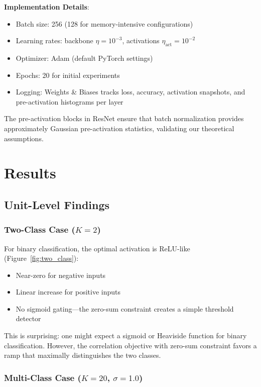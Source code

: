 \documentclass{article}
\begin{document}
\textbf{Implementation Details}:
\begin{itemize}
\item Batch size: 256 (128 for memory-intensive configurations)
\item Learning rates: backbone $\eta=10^{-3}$, activations $\eta_{\text{act}}=10^{-2}$
\item Optimizer: Adam (default PyTorch settings)
\item Epochs: 20 for initial experiments
\item Logging: Weights \& Biases tracks loss, accuracy, activation snapshots, and pre-activation histograms per layer
\end{itemize}

The pre-activation blocks in ResNet ensure that batch normalization provides approximately Gaussian pre-activation statistics, validating our theoretical assumptions.

\section{Results}
\label{sec:results}

\subsection{Unit-Level Findings}

\subsubsection{Two-Class Case ($K=2$)}

For binary classification, the optimal activation is ReLU-like (Figure~\ref{fig:two_class}):
\begin{itemize}
\item Near-zero for negative inputs
\item Linear increase for positive inputs
\item No sigmoid gating---the zero-sum constraint creates a simple threshold detector
\end{itemize}

This is surprising: one might expect a sigmoid or Heaviside function for binary classification. However, the correlation objective with zero-sum constraint favors a ramp that maximally distinguishes the two classes.

\subsubsection{Multi-Class Case ($K=20$, $\sigma=1.0$)}
\end{document}
